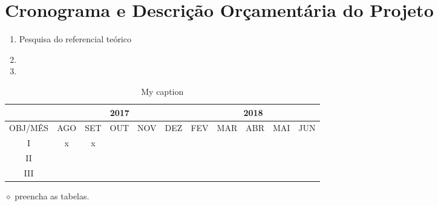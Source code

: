 \documentclass[
	12pt,				%
	openright,			%
	oneside,			%
	a4paper,			%
	english,			%
	french,				%
	spanish,			%
	brazil,				%
	]{abntex2}
\newcommand{\danielobs}[1]{{\color{red} $\diamond$ #1}}
\begin{document}
\section*{Cronograma e Descrição Orçamentária do Projeto}
	\begin{enumerate}[label=\Roman*)]
	\item Pesquisa do referencial teórico	
	
	\item 
	
	\item 
	
	\end{enumerate}

\begin{table}[h!]
	\centering
	\caption{My caption}
	\label{my-label}
	\begin{tabular}{c|c|c|c|c|c|c|c|c|c|c|}
		\cline{2-11}
		& \multicolumn{5}{c|}{2017}   & \multicolumn{5}{c|}{2018}   \\ \hline
		\multicolumn{1}{|c|}{OBJ/MÊS} & AGO & SET & OUT & NOV & DEZ & FEV & MAR & ABR & MAI & JUN \\ \hline
		\multicolumn{1}{|c|}{I}       & x   & x   &     &     &     &     &     &     &     &     \\ \hline
		\multicolumn{1}{|c|}{II}      &     &     &     &     &     &     &     &     &     &     \\ \hline
		\multicolumn{1}{|c|}{III}     &     &     &     &     &     &     &     &     &     &     \\ \hline
	\end{tabular}
\end{table}

\danielobs{preencha as tabelas.}


\end{document}
